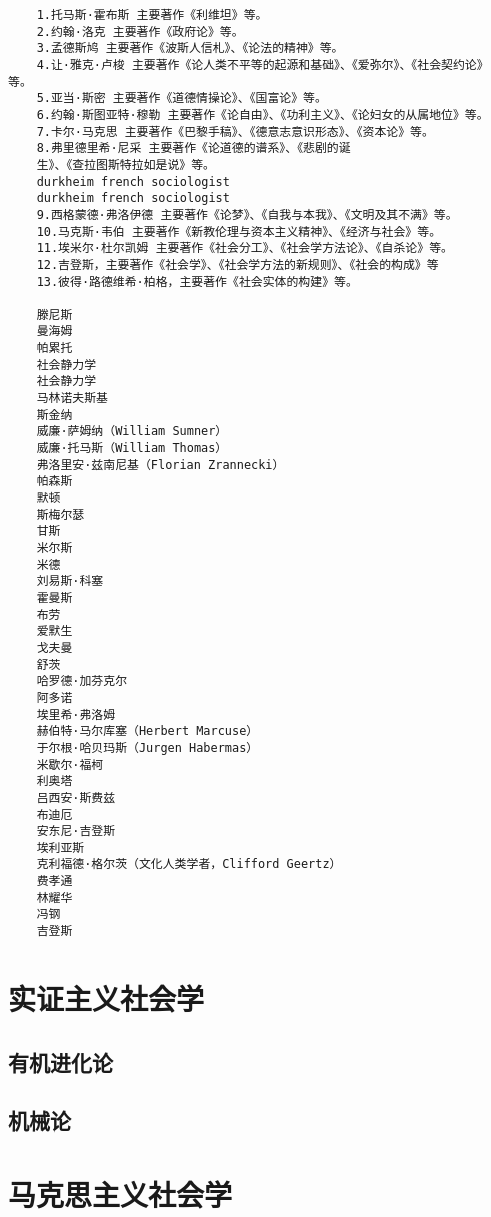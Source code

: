 \documentclass[UTF8]{../RepresentationUniverse}
\begin{document}
\begin{lstlisting}
    1.托马斯·霍布斯 主要著作《利维坦》等。
    2.约翰·洛克 主要著作《政府论》等。
    3.孟德斯鸠 主要著作《波斯人信札》、《论法的精神》等。
    4.让·雅克·卢梭 主要著作《论人类不平等的起源和基础》、《爱弥尔》、《社会契约论》等。
    5.亚当·斯密 主要著作《道德情操论》、《国富论》等。
    6.约翰·斯图亚特·穆勒 主要著作《论自由》、《功利主义》、《论妇女的从属地位》等。
    7.卡尔·马克思 主要著作《巴黎手稿》、《德意志意识形态》、《资本论》等。
    8.弗里德里希·尼采 主要著作《论道德的谱系》、《悲剧的诞
    生》、《查拉图斯特拉如是说》等。
    durkheim french sociologist
    durkheim french sociologist
    9.西格蒙德·弗洛伊德 主要著作《论梦》、《自我与本我》、《文明及其不满》等。
    10.马克斯·韦伯 主要著作《新教伦理与资本主义精神》、《经济与社会》等。
    11.埃米尔·杜尔凯姆 主要著作《社会分工》、《社会学方法论》、《自杀论》等。
    12.吉登斯，主要著作《社会学》、《社会学方法的新规则》、《社会的构成》等
    13.彼得·路德维希·柏格，主要著作《社会实体的构建》等。

    滕尼斯
    曼海姆
    帕累托
    社会静力学
    社会静力学
    马林诺夫斯基
    斯金纳
    威廉·萨姆纳（William Sumner）
    威廉·托马斯（William Thomas）
    弗洛里安·兹南尼基（Florian Zrannecki）
    帕森斯
    默顿
    斯梅尔瑟
    甘斯
    米尔斯
    米德
    刘易斯·科塞
    霍曼斯
    布劳
    爱默生
    戈夫曼
    舒茨
    哈罗德·加芬克尔
    阿多诺
    埃里希·弗洛姆
    赫伯特·马尔库塞（Herbert Marcuse）
    于尔根·哈贝玛斯（Jurgen Habermas）
    米歇尔·福柯
    利奥塔
    吕西安·斯费兹
    布迪厄
    安东尼·吉登斯
    埃利亚斯
    克利福德·格尔茨（文化人类学者，Clifford Geertz）
    费孝通
    林耀华
    冯钢
    吉登斯
\end{lstlisting}

\section{实证主义社会学}
\subsection{有机进化论}
\subsection{机械论}


\section{马克思主义社会学}
\end{document}
